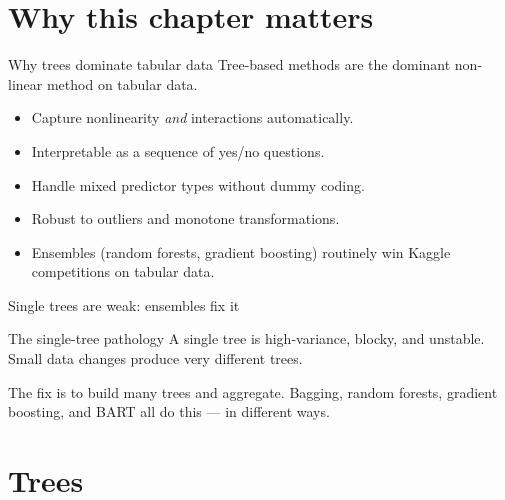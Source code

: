\documentclass[aspectratio=169,11pt]{beamer}
\begin{document}
\section{Why this chapter matters}

\begin{frame}{Why trees dominate tabular data}
  Tree-based methods are the dominant non-linear method on tabular
  data.
  \begin{takeaway}
    \begin{itemize}
      \item Capture nonlinearity \emph{and} interactions automatically.
      \item Interpretable as a sequence of yes/no questions.
      \item Handle mixed predictor types without dummy coding.
      \item Robust to outliers and monotone transformations.
      \item Ensembles (random forests, gradient boosting) routinely
            win Kaggle competitions on tabular data.
    \end{itemize}
  \end{takeaway}
\end{frame}

\begin{frame}{Single trees are weak: ensembles fix it}
  \begin{alertblock}{The single-tree pathology}
    A single tree is high-variance, blocky, and unstable. Small data
    changes produce very different trees.
  \end{alertblock}
  \begin{takeaway}
    The fix is to build many trees and aggregate. Bagging, random
    forests, gradient boosting, and BART all do this --- in different
    ways.
  \end{takeaway}
\end{frame}



\section{Trees}
\end{document}
